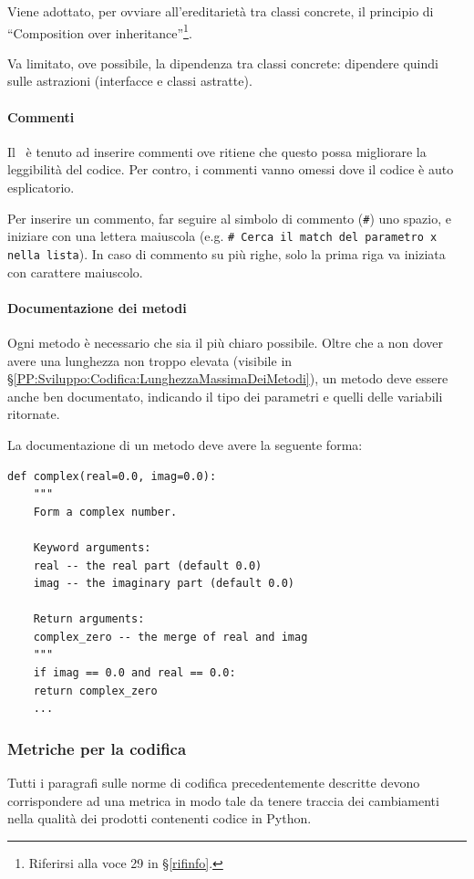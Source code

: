 		Viene adottato, per ovviare all'ereditarietà tra classi concrete, il principio di ``Composition over inheritance''\footnote{Riferirsi alla voce
		29
		 in \S\ref{rifinfo}.}.

		Va limitato, ove possibile, la dipendenza tra classi concrete: dipendere quindi sulle astrazioni (interfacce e classi astratte).

        \paragraph{Commenti}\label{PP:Sviluppo:Codifica:Commenti}
		Il \Progr\ è tenuto ad inserire commenti ove ritiene che questo possa migliorare la leggibilità del codice. Per contro, i commenti vanno
		omessi dove il codice è auto esplicatorio.\par
		Per inserire un commento, far seguire al simbolo di commento (\texttt{\#}) uno spazio, e iniziare con una lettera maiuscola (e.g.
		\texttt{\#\ Cerca il match del parametro x nella lista}). In caso di commento su più righe, solo la prima riga va iniziata con carattere
		maiuscolo.

        \paragraph{Documentazione dei metodi}\label{PP:Sviluppo:Codifica:DocumentazioneDeiMetodi}
        Ogni metodo è necessario che sia il più chiaro possibile. Oltre che a non dover avere una lunghezza non troppo elevata (visibile in \S\ref{PP:Sviluppo:Codifica:LunghezzaMassimaDeiMetodi}), un metodo deve essere anche ben documentato, indicando il tipo dei parametri e quelli delle variabili ritornate.

        La documentazione di un metodo deve avere la seguente forma:
\begin{verbatim}
def complex(real=0.0, imag=0.0):
    """
    Form a complex number.

    Keyword arguments:
    real -- the real part (default 0.0)
    imag -- the imaginary part (default 0.0)

    Return arguments:
    complex_zero -- the merge of real and imag
    """
    if imag == 0.0 and real == 0.0:
    return complex_zero
    ...
\end{verbatim}

        \subsubsection{Metriche per la codifica}\label{PP:Sviluppo:MetricheCodifica}
        Tutti i paragrafi sulle norme di codifica precedentemente descritte devono corrispondere ad una metrica in modo tale da tenere traccia dei cambiamenti nella qualità dei prodotti contenenti codice in Python.

